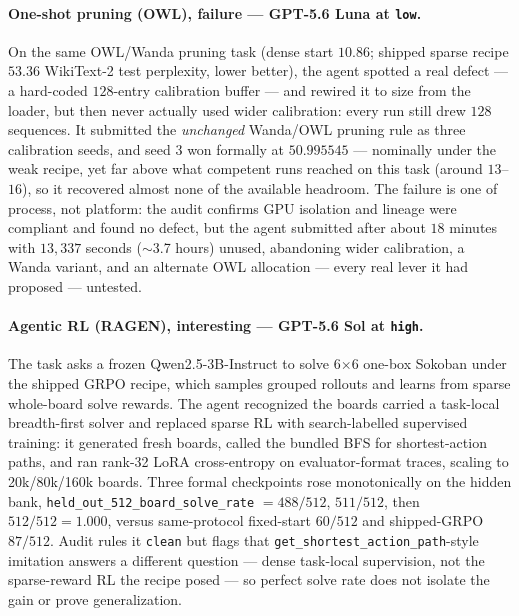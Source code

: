 \paragraph{One-shot pruning (OWL), failure --- GPT-5.6 Luna at \texttt{low}.} On the same OWL/Wanda pruning task (dense start $10.86$; shipped sparse recipe $53.36$ WikiText-2 test perplexity, lower better), the agent spotted a real defect --- a hard-coded $128$-entry calibration buffer --- and rewired it to size from the loader, but then never actually used wider calibration: every run still drew $128$ sequences. It submitted the \emph{unchanged} Wanda/OWL pruning rule as three calibration seeds, and seed $3$ won formally at $50.995545$ --- nominally under the weak recipe, yet far above what competent runs reached on this task (around $13$--$16$), so it recovered almost none of the available headroom. The failure is one of process, not platform: the audit confirms GPU isolation and lineage were compliant and found no defect, but the agent submitted after about $18$ minutes with $13{,}337$ seconds ($\sim$3.7 hours) unused, abandoning wider calibration, a Wanda variant, and an alternate OWL allocation --- every real lever it had proposed --- untested.

\paragraph{Agentic RL (RAGEN), interesting --- GPT-5.6 Sol at \texttt{high}.} The task asks a frozen Qwen2.5-3B-Instruct to solve 6$\times$6 one-box Sokoban under the shipped GRPO recipe, which samples grouped rollouts and learns from sparse whole-board solve rewards. The agent recognized the boards carried a task-local breadth-first solver and replaced sparse RL with search-labelled supervised training: it generated fresh boards, called the bundled BFS for shortest-action paths, and ran rank-32 LoRA cross-entropy on evaluator-format traces, scaling to 20k/80k/160k boards. Three formal checkpoints rose monotonically on the hidden bank, \texttt{held\_out\_512\_board\_solve\_rate} $=488/512$, $511/512$, then $512/512=1.000$, versus same-protocol fixed-start $60/512$ and shipped-GRPO $87/512$. Audit rules it \texttt{clean} but flags that \texttt{get\_shortest\_action\_path}-style imitation answers a different question --- dense task-local supervision, not the sparse-reward RL the recipe posed --- so perfect solve rate does not isolate the gain or prove generalization.

